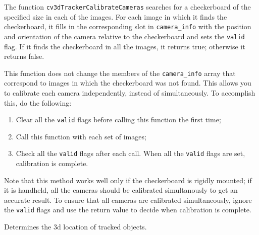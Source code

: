 \begin{description}
\end{description}

The function \texttt{cv3dTrackerCalibrateCameras} searches for a checkerboard of the specified size in each of the images. For each image in which it finds the checkerboard, it fills in the corresponding slot in \texttt{camera\_info} with the position and orientation of the camera relative to the checkerboard and sets the \texttt{valid} flag. If it finds the checkerboard in all the images, it returns true; otherwise it returns false.

This function does not change the members of the \texttt{camera\_info} array that correspond to images in which the checkerboard was not found. This allows you to calibrate each camera independently, instead of simultaneously. To accomplish this, do the following:
\begin{enumerate}
\item Clear all the \texttt{valid} flags before calling this function the first time;
\item Call this function with each set of images;
\item Check all the \texttt{valid} flags after each call. When all the \texttt{valid} flags are set, calibration is complete.
\end{enumerate}

Note that this method works well only if the checkerboard is rigidly mounted; if it is handheld, all the cameras should be calibrated simultanously to get an accurate result. To ensure that all cameras are calibrated simultaneously, ignore the \texttt{valid} flags and use the return value to decide when calibration is complete.


Determines the 3d location of tracked objects.


